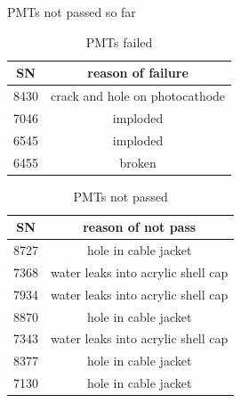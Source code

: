 \documentclass{beamer}
\begin{document}
\begin{frame}{PMTs not passed so far}
	\begin{center}
		\begin{table}
			\begin{tabular}{|c|c|}
			\hline
			SN   & reason of failure \\
			\hline
			8430 & crack and hole on photocathode \\
			7046 & imploded \\
			6545 & imploded \\
			6455 & broken \\
			\hline
			\end{tabular}
		\caption{PMTs failed}
		\end{table}

		\begin{table}
			\begin{tabular}{|c|c|}
			\hline
			SN   & reason of not pass \\
			\hline
			8727 & hole in cable jacket \\
			7368 & water leaks into acrylic shell cap \\
			7934 & water leaks into acrylic shell cap \\
			8870 & hole in cable jacket \\
			7343 & water leaks into acrylic shell cap \\
			8377 & hole in cable jacket \\
			7130 & hole in cable jacket \\
			\hline
			\end{tabular}
		\caption{PMTs not passed}
		\end{table}
	\end{center}
\end{frame}
\end{document}
